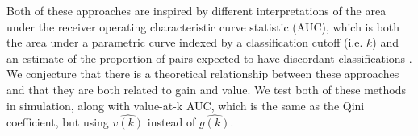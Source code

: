 Both of these approaches are inspired by different interpretations of the area under the receiver operating characteristic curve statistic (AUC), which is both the area under a parametric curve indexed by a classification cutoff (i.e. $k$) and an estimate of the proportion of pairs expected to have discordant classifications \cite{Hanley:1982cz}. We conjecture that there is a theoretical relationship between these approaches and that they are both related to gain and value. We test both of these methods in simulation, along with value-at-k AUC, which is the same as the Qini coefficient, but using $\hat{v(k)}$ instead of $\hat{g(k)}$.


\begin{comment}

Recall that the decision policy can be parametrized with a cutoff $k$: $\hat d(x,k) = I(\hat\tau>k)$. We can therefore also calculate the gain at $k$, $\hat g(k)$, which is the gain obtained when individuals with an estimated treatment effect greater than $k$ are treated. Researchers in direct marketing often rely on \emph{uplift curves} (also called gain curves or cumulative gain charts) \ to aid in model selection. The uplift curve plots gain at $k$:

\[
	\hat g(k)  =  \sum_{\mathcal{V}} \dfrac{y_i  \hat d(x_i,k) (2w_i-1)}{p_{w_i}(x_i)} 
\]




Researchers either evaluate these curves heuristically, take the maximum value over $k$, or calculate the \emph{Qini coefficient}, which is the area under the uplift curve \cite{Gutierrez:2016tq}. Given the relationship between gain and value, maximizing these metrics is equivalent to maximizing the equivalent value-based metric. 

\subsubsection{The concordance-for-benefit statistic}

\citet{vanKlaveren:2018gg} propose the concordance-for-benefit statistic to select among treatment effect models. Briefly, each individual $i$ in the test set is matched without replacement according to estimated treatment effect with another individual in the test set $\bar{i}$ ($\hat\tau(x_i) \approx \hat\tau(x_{\bar i})$) with the opposite treatment $w_i \ne w_{\bar i}$. The total number of pairs is $J$. For each pair of matched patients $j$, the difference in outcomes between the treated and untreated individuals is recorded: $\delta_j = (2w_i - 1)(y_i -y_{\bar i})$, along with the predicted treatment effect for both patients $t_j = \hat\tau(x_i)$. The concordance-for-benefit (or c-for-benefit) statistic is


\end{comment}
